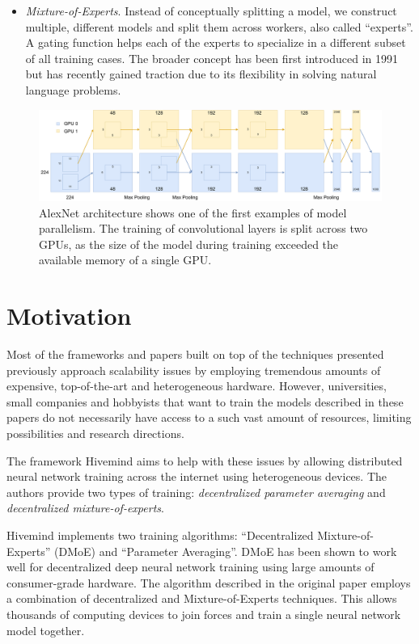 \begin{itemize}
    \item \textit{Mixture-of-Experts}.
          Instead of conceptually splitting a model, we construct multiple, different models and split them across workers, also called ``experts''.
          A gating function helps each of the experts to specialize in a different subset of all training cases.
          The broader concept has been first introduced in 1991 \cite{Jacobs1991mixtureofexperts} but has recently gained traction due to its flexibility in solving natural language problems.
\end{itemize}

\begin{figure}[h]
    \caption{AlexNet \cite{alexnet2012} architecture shows one of the first examples of model parallelism. The training of convolutional layers is split across two GPUs, as the size of the model during training exceeded the available memory of a single GPU.}
    \label{fig:alexnet}
    \includegraphics[width=\textwidth]{./figures/alexnet.pdf}
\end{figure}

\section{Motivation}

Most of the frameworks and papers built on top of the techniques presented previously approach scalability issues by employing tremendous amounts of expensive, top-of-the-art and heterogeneous hardware.
However, universities, small companies and hobbyists that want to train the models described in these papers do not necessarily have access to a such vast amount of resources, limiting possibilities and research directions.

The framework Hivemind \cite{riabinin2020hivemind} aims to help with these issues by allowing distributed neural network training across the internet using heterogeneous devices.
The authors provide two types of training: \textit{decentralized parameter averaging} and \textit{decentralized mixture-of-experts}.

Hivemind implements two training algorithms: ``Decentralized Mixture-of-Experts'' (DMoE) \cite{ryabinin2020learning} and ``Parameter Averaging''.
DMoE has been shown to work well for decentralized deep neural network training using large amounts of consumer-grade hardware.
The algorithm described in the original paper employs a combination of decentralized and Mixture-of-Experts \cite{shazeer2017outrageously} techniques.
This allows thousands of computing devices to join forces and train a single neural network model together.

